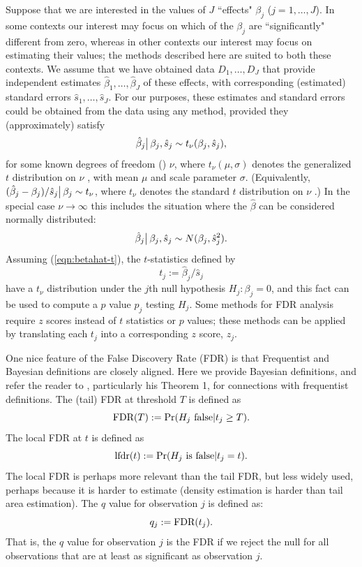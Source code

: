 \documentclass[11pt]{article}
\def\bhat{\hat{\beta}}
\def\shat{\hat{s}}
\begin{document}
Suppose that we are interested in the values of $J$ ``effects" $\beta_j$ ($j=1,\dots,J$). In some contexts our interest may focus on which of the $\beta_j$ are ``significantly" different from zero, whereas in other contexts our interest may focus on estimating their values; the methods described here are suited to both these contexts.
 We assume that we have obtained data $D_1,\dots,D_J$ that provide independent estimates $\bhat_1,\dots,\bhat_J$ of these effects,
 with corresponding (estimated) standard errors $\shat_1,\dots,\shat_J$. For our purposes, these estimates and standard errors could be obtained from the data
 using any method, provided they (approximately) satisfy 
 \begin{equation} \label{eqn:betahat-t}
 \bhat_j \big{|} \, \beta_j, \shat_j \sim t_\nu(\beta_j,\shat_j),
 \end{equation}
for some known degrees of freedom (\df) $\nu$, where $t_\nu(\mu,\sigma)$ denotes the generalized $t$ distribution on $\nu$ \df, with mean $\mu$ and scale parameter $\sigma$. (Equivalently, $(\bhat_j-\beta_j)/\shat_j \big{|} \, \beta_j \sim t_\nu$, where $t_\nu$ denotes the standard $t$ distribution on $\nu$ \df.)
In the special case $\nu \rightarrow \infty$ this includes the situation where the $\bhat$ can be considered normally distributed:
  \begin{equation} \label{eqn:betahat-norm}
 \bhat_j  \big{|} \, \beta_j, \shat_j \sim N(\beta_j,\shat^2_j).
 \end{equation}
 Assuming (\ref{eqn:betahat-t}), the $t$-statistics defined by
 \begin{equation} 
 t_j:=\bhat_j/\shat_j
 \end{equation}
 have a $t_\nu$ distribution under the $j$th null hypothesis $H_j:\beta_j=0$, and this fact can be used to compute a $p$ value $p_j$ testing $H_j$.
Some methods for FDR analysis require $z$ scores instead of $t$ statistics or $p$ values; these methods can be applied by translating each $t_j$ into a corresponding
$z$ score, $z_j$.


One nice feature of the False Discovery Rate (FDR) is that Frequentist and Bayesian definitions are closely aligned.
Here we provide Bayesian definitions, and refer the reader to \cite{storey.03}, particularly his Theorem 1,  for connections with frequentist definitions.
The (tail) FDR at threshold $T$ is defined as
\begin{equation}
\text{FDR}(T) := \Pr(\text{$H_j$ false} | t_j \geq T).
\end{equation}
The local FDR at $t$ is defined \cite{efron2008microarrays} as
\begin{equation}
\text{lfdr}(t) := \Pr(\text{$H_j$ is false} | t_j = t).
\end{equation}
The local FDR is perhaps more relevant than the tail FDR, but less widely used, perhaps because
it is harder to estimate (density estimation is harder than tail area estimation). 
The $q$ value for observation $j$ is defined \cite{storey.03} as:
\begin{equation}
q_j := \text{FDR}(t_j).
\end{equation}
That is, the $q$ value for observation $j$ is the FDR if we reject the null for all observations that are at least as significant as observation $j$.
\end{document}
